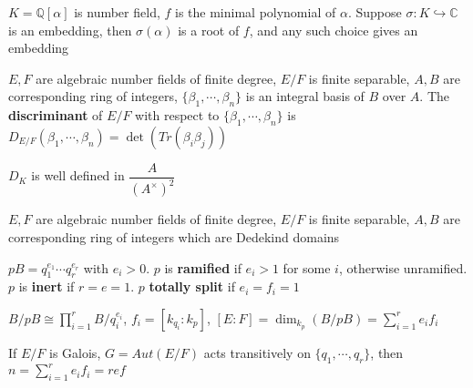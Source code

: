 \documentclass[main]{subfiles}
\begin{document}
\begin{lemma}
$K=\mathbb Q[\alpha]$ is number field, $f$ is the minimal polynomial of $\alpha$. Suppose $\sigma :K\hookrightarrow\mathbb C$ is an embedding, then $\sigma(\alpha)$ is a root of $f$, and any such choice gives an embedding
\end{lemma}

\begin{definition}
$E,F$ are algebraic number fields of finite degree, $E/F$ is finite separable, $A,B$ are corresponding ring of integers, $\{\beta_1,\cdots,\beta_n\}$ is an integral basis of $B$ over $A$. The \textbf{discriminant} of $E/F$ with respect to $\{\beta_1,\cdots,\beta_n\}$ is $D_{E/F}(\beta_1,\cdots,\beta_n)=\det(Tr(\beta_i\beta_j))$
\begin{center}
\end{center}
\end{definition}

\begin{lemma}
$D_K$ is well defined in $\dfrac{A}{(A^\times)^2}$
\end{lemma}

\begin{definition}
$E,F$ are algebraic number fields of finite degree, $E/F$ is finite separable, $A,B$ are corresponding ring of integers which are Dedekind domains
\begin{center}
\end{center}
$pB=q_1^{e_1}\cdots q_r^{e_r}$ with $e_i>0$. $p$ is \textbf{ramified} if $e_i>1$ for some $i$, otherwise unramified. $p$ is \textbf{inert} if $r=e=1$. $p$ \textbf{totally split} if $e_i=f_i=1$ \par
$B/pB\cong\prod_{i=1}^rB/q_i^{e_i}$, $f_i=[k_{q_i}:k_p]$, $[E:F]=\dim_{k_p}(B/pB)=\sum_{i=1}^re_if_i$ \par
If $E/F$ is Galois, $G=Aut(E/F)$ acts transitively on $\{q_1,\cdots,q_r\}$, then $n=\sum_{i=1}^re_if_i=ref$
\end{definition}
\end{document}
